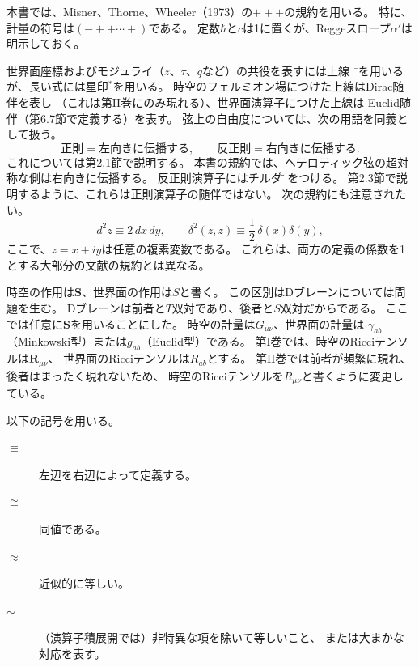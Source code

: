 \clearpage
{}
本書では、Misner、Thorne、Wheeler（1973）\cite{Misner:1973prb}の$+++$の規約を用いる。
特に、計量の符号は$(-++\cdots+)$である。
定数$\hbar$と$c$は1に置くが、Reggeスロープ$\alpha'$は明示しておく。

世界面座標およびモジュライ（$z$、$\tau$、$q$など）の共役を表すには上線
$\bar{\phantom{z}}$を用いるが、長い式には星印${}^{*}$を用いる。
時空のフェルミオン場につけた上線はDirac随伴を表し
（これは第II巻にのみ現れる）、世界面演算子につけた上線は
Euclid随伴（第6.7節で定義する）を表す。
弦上の自由度については、次の用語を同義として扱う。
\[
 \text{正則}=\text{左向きに伝播する},\qquad
 \text{反正則}=\text{右向きに伝播する}.
\]
これについては第2.1節で説明する。
本書の規約では、ヘテロティック弦の超対称な側は右向きに伝播する。
反正則演算子にはチルダ$\tilde{\phantom{z}}$をつける。
第2.3節で説明するように、これらは正則演算子の随伴ではない。
次の規約にも注意されたい。
\[
 d^{2}z\equiv 2\,dx\,dy,\qquad
 \delta^{2}(z,\bar z)\equiv\frac12\,\delta(x)\delta(y),
\]
ここで、$z=x+iy$は任意の複素変数である。
これらは、両方の定義の係数を1とする大部分の文献の規約とは異なる。

時空の作用は$\boldsymbol{S}$、世界面の作用は$S$と書く。
この区別はDブレーンについては問題を生む。
Dブレーンは前者と$T$双対であり、後者と$S$双対だからである。
ここでは任意に$\boldsymbol{S}$を用いることにした。
時空の計量は$G_{\mu\nu}$、世界面の計量は
$\gamma_{ab}$（Minkowski型）または$g_{ab}$（Euclid型）である。
第I巻では、時空のRicciテンソルは$\boldsymbol{R}_{\mu\nu}$、
世界面のRicciテンソルは$R_{ab}$とする。
第II巻では前者が頻繁に現れ、後者はまったく現れないため、
時空のRicciテンソルを$R_{\mu\nu}$と書くように変更している。

以下の記号を用いる。
\begin{description}
\item[$\equiv$] 左辺を右辺によって定義する。
\item[$\cong$] 同値である。
\item[$\approx$] 近似的に等しい。
\item[$\sim$] （演算子積展開では）非特異な項を除いて等しいこと、
または大まかな対応を表す。
\end{description}
